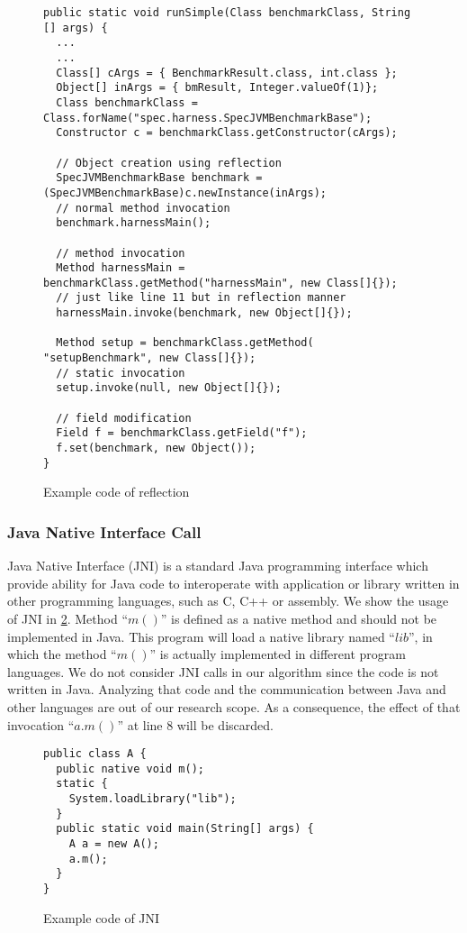 \documentclass{fac}
\begin{document}
\begin{figure}
\begin{lstlisting}
public static void runSimple(Class benchmarkClass, String [] args) {
  ...
  ...
  Class[] cArgs = { BenchmarkResult.class, int.class };
  Object[] inArgs = { bmResult, Integer.valueOf(1)};
  Class benchmarkClass = Class.forName("spec.harness.SpecJVMBenchmarkBase");
  Constructor c = benchmarkClass.getConstructor(cArgs);

  // Object creation using reflection
  SpecJVMBenchmarkBase benchmark = (SpecJVMBenchmarkBase)c.newInstance(inArgs);
  // normal method invocation
  benchmark.harnessMain();
  
  // method invocation
  Method harnessMain = benchmarkClass.getMethod("harnessMain", new Class[]{});
  // just like line 11 but in reflection manner
  harnessMain.invoke(benchmark, new Object[]{}); 
  
  Method setup = benchmarkClass.getMethod( "setupBenchmark", new Class[]{});
  // static invocation
  setup.invoke(null, new Object[]{});
  
  // field modification
  Field f = benchmarkClass.getField("f");
  f.set(benchmark, new Object());
}
\end{lstlisting}
\caption{Example code of reflection}
\label{fig:reflection}
\end{figure}

\subsubsection{Java Native Interface Call}\label{subsubsec:jni-call}
Java Native Interface (JNI) is a standard Java programming interface which provide ability for Java code to interoperate with application or library written in other programming languages, such as C, C++ or assembly. We show the usage of JNI in \ref{fig:jni}. Method ``$m()$'' is defined as a native method and should not be implemented in Java. This program will load a native library named ``$lib$'', in which the method ``$m()$'' is actually implemented in different program languages. We do not consider JNI calls in our algorithm since the code is not written in Java. Analyzing that code and the communication between Java and other languages are out of our research scope. As a consequence, the effect of that invocation ``$a.m()$'' at line 8 will be discarded.
\begin{figure}
\begin{lstlisting}
public class A {
  public native void m();
  static {
    System.loadLibrary("lib");
  }
  public static void main(String[] args) {
    A a = new A();
    a.m();
  }
}
\end{lstlisting}
\caption{Example code of JNI}
\label{fig:jni}
\end{figure}
\end{document}
